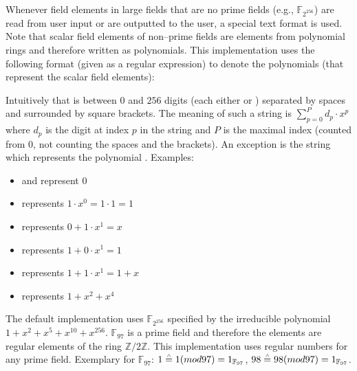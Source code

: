 




%
%
\label{sec:user-io}

Whenever field elements in large fields that are no prime fields (e.g.,
$\mathbb{F}_{2^{256}}$) are read from user input or are outputted to the user, a
special text format is used. Note that scalar field elements of non--prime
fields are elements from polynomial rings and therefore written as polynomials.
This implementation uses the following format (given as a regular expression) to
denote the polynomials (that represent the scalar field elements):

\JWcode{\textbackslash[([01]( [01])\{0,255\})?\textbackslash]}

\noindent{}Intuitively that is between $0$ and $256$ digits (each either
 or ) separated by spaces and surrounded by square brackets.
The meaning of such a string is $\sum_{p=0}^{P} d_p \cdot x^p$ where $d_p$ is
the digit at index $p$ in the string and $P$ is the maximal index (counted from
$0$, not counting the spaces and the brackets). An exception is the string
\JWcode{[]} which represents the polynomial .  Examples:

\begin{itemize}

  \item \JWcode{[]} and \JWcode{[0]} represent $0$

  \item \JWcode{[1]} represents $1 \cdot x^0 = 1 \cdot 1 = 1$

  \item \JWcode{[0 1]} represents $0 + 1 \cdot x^1 = x$

  \item \JWcode{[1 0]} represents $1 + 0 \cdot x^1 = 1$

  \item \JWcode{[1 1]} represents $1 + 1 \cdot x^1 = 1 + x$

  \item \JWcode{[1 0 1 0 1 0]} represents $1 + x^2 + x^4$

\end{itemize}

\noindent{}The default implementation uses $\mathbb{F}_{2^{256}}$ specified by
the irreducible polynomial $1 + x^2 + x^5 + x^{10} + x^{256}$.
$\mathbb{F}_{97}$ is a prime field and therefore the elements are regular
elements of the ring $\mathbb{Z}/2\mathbb{Z}$.  This implementation uses regular
numbers for any prime field. Exemplary for $\mathbb{F}_{97}$: $1 \stackrel{\scriptscriptstyle\wedge}{=} 1
(mod 97) = 1_{\mathbb{F}_{97}}$, $98 \stackrel{\scriptscriptstyle\wedge}{=} 98 (mod 97) =
1_{\mathbb{F}_{97}}$.


